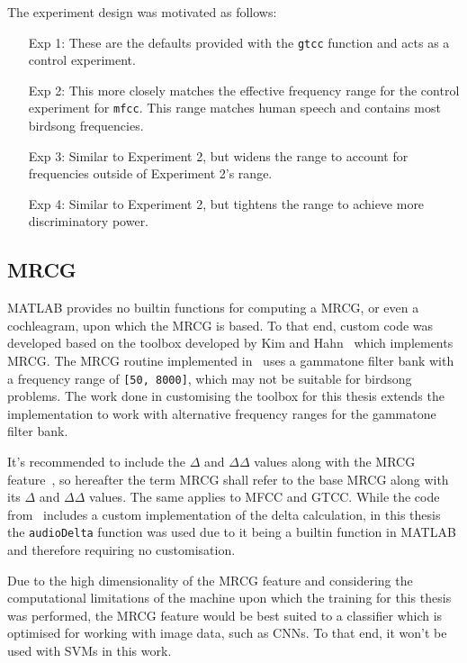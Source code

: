 The experiment design was motivated as follows:

\begin{itemize}

  \item [Exp 1:] These are the defaults provided with the \texttt{gtcc} function
    and acts as a control experiment.

  \item [Exp 2:] This more closely matches the effective frequency range for the
    control experiment for \texttt{mfcc}. This range matches human speech and
    contains most birdsong frequencies.

  \item [Exp 3:] Similar to Experiment 2, but widens the range to account for
    frequencies outside of Experiment 2's range.

  \item [Exp 4:] Similar to Experiment 2, but tightens the range to achieve more
    discriminatory power.

\end{itemize}

\subsection{MRCG}

MATLAB provides no builtin functions for computing a MRCG, or even a
cochleagram, upon which the MRCG is based. To that end, custom code was
developed based on the toolbox developed by Kim and Hahn~\cite{kim2018voice}
which implements MRCG\@. The MRCG routine implemented in~\cite{kim2018voice}
uses a gammatone filter bank with a frequency range of \texttt{[50, 8000]},
which may not be suitable for birdsong problems. The work done in customising
the toolbox for this thesis extends the implementation to work with alternative
frequency ranges for the gammatone filter bank.

It's recommended to include the $\Delta$ and $\Delta\Delta$ values along with
the MRCG feature~\cite{chen2014feature}, so hereafter the term MRCG shall refer
to the base MRCG along with its $\Delta$ and $\Delta\Delta$ values. The same
applies to MFCC and GTCC\@. While the code from~\cite{kim2018voice} includes a
custom implementation of the delta calculation, in this thesis the
\texttt{audioDelta} function was used due to it being a builtin function in
MATLAB and therefore requiring no customisation.

Due to the high dimensionality of the MRCG feature and considering the
computational limitations of the machine upon which the training for this thesis
was performed, the MRCG feature would be best suited to a classifier which is
optimised for working with image data, such as CNNs\@. To that end, it won't
be used with SVMs in this work.

